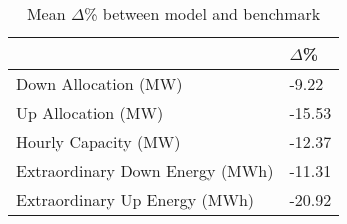 \begin{table}[H] 
    \caption{Mean $\Delta$\% between model and benchmark\label{model_vs_bench_perc}}
    \begin{tabularx}{\textwidth}{CC}
    \toprule
    & \textbf{$\Delta$\%} \\
    

    \midrule
            Down Allocation (MW)	        & -9.22 \\
            Up Allocation (MW)              & -15.53 \\
            Hourly Capacity (MW)	        & -12.37 \\
            Extraordinary Down Energy (MWh)	& -11.31 \\
            Extraordinary Up Energy (MWh)	& -20.92 \\
    \bottomrule
    \end{tabularx}
\end{table}

